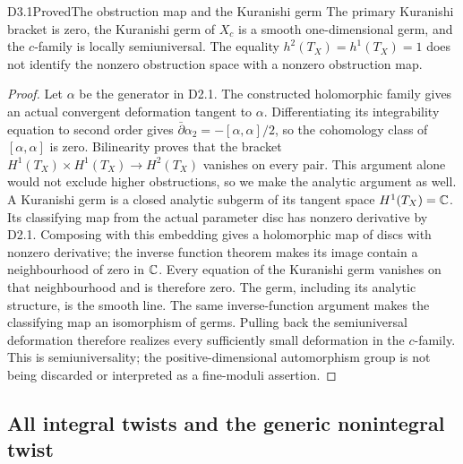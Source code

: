 \begin{claim}{D3.1}{Proved}{The obstruction map and the Kuranishi germ}
The primary Kuranishi bracket is zero, the Kuranishi germ of $X_c$ is
a smooth one-dimensional germ, and the $c$-family is locally
semiuniversal. The equality $h^2(T_X)=h^1(T_X)=1$ does not identify the
nonzero obstruction space with a nonzero obstruction map.
\end{claim}
\begin{proof}
Let $\alpha$ be the generator in D2.1. The constructed holomorphic
family gives an actual convergent deformation tangent to $\alpha$.
Differentiating its integrability equation to second order gives
$\bar\partial\alpha_2=-[\alpha,\alpha]/2$, so the cohomology class
of $[\alpha,\alpha]$ is zero. Bilinearity proves that the bracket
$H^1(T_X)\times H^1(T_X)\to H^2(T_X)$ vanishes on every pair.
This argument alone would not exclude higher obstructions, so we
make the analytic argument as well. A Kuranishi germ is a closed
analytic subgerm of its tangent space $H^1(T_X)=\mathbb C$. Its classifying
map from the actual parameter disc has nonzero derivative by D2.1.
Composing with this embedding gives a holomorphic map of discs with
nonzero derivative; the inverse function theorem makes its image
contain a neighbourhood of zero in $\mathbb C$. Every equation of the
Kuranishi germ vanishes on that neighbourhood and is therefore zero.
The germ, including its analytic structure, is the smooth line.
The same inverse-function argument makes the classifying map an
isomorphism of germs. Pulling back the semiuniversal deformation
therefore realizes every sufficiently small deformation in the
$c$-family. This is semiuniversality; the positive-dimensional
automorphism group is not being discarded or interpreted as a
fine-moduli assertion.
\end{proof}

\subsection{All integral twists and the generic nonintegral twist}


